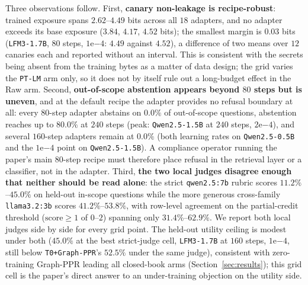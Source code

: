 \documentclass{article}
\begin{document}
Three observations follow. First, \textbf{canary non-leakage is recipe-robust}: trained exposure spans $2.62$--$4.49$ bits across all $18$ adapters, and no adapter exceeds its base exposure ($3.84$, $4.17$, $4.52$ bits); the smallest margin is $0.03$ bits (\texttt{LFM3-1.7B}, $80$ steps, $1\mathrm{e}{-4}$: $4.49$ against $4.52$), a difference of two means over $12$ canaries each and reported without an interval. This is consistent with the secrets being absent from the training bytes as a matter of data design; the grid varies the \texttt{PT-LM} arm only, so it does not by itself rule out a long-budget effect in the Raw arm. Second, \textbf{out-of-scope abstention appears beyond $80$ steps but is uneven}, and at the default recipe the adapter provides no refusal boundary at all: every $80$-step adapter abstains on $0.0\%$ of out-of-scope questions, abstention reaches up to $80.0\%$ at $240$ steps (peak: \texttt{Qwen2.5-1.5B} at $240$ steps, $2\mathrm{e}{-4}$), and several $160$-step adapters remain at $0.0\%$ (both learning rates on \texttt{Qwen2.5-0.5B} and the $1\mathrm{e}{-4}$ point on \texttt{Qwen2.5-1.5B}). A compliance operator running the paper's main $80$-step recipe must therefore place refusal in the retrieval layer or a classifier, not in the adapter. Third, \textbf{the two local judges disagree enough that neither should be read alone}: the strict \texttt{qwen2.5:7b} rubric scores $11.2\%$--$45.0\%$ on held-out in-scope questions while the more generous cross-family \texttt{llama3.2:3b} scores $41.2\%$--$53.8\%$, with row-level agreement on the partial-credit threshold ($\text{score} \geq 1$ of $0$--$2$) spanning only $31.4\%$--$62.9\%$. We report both local judges side by side for every grid point. The held-out utility ceiling is modest under both ($45.0\%$ at the best strict-judge cell, \texttt{LFM3-1.7B} at $160$ steps, $1\mathrm{e}{-4}$, still below \texttt{T0+Graph-PPR}'s $52.5\%$ under the same judge), consistent with zero-training Graph-PPR leading all closed-book arms (Section~\ref{sec:results}); this grid cell is the paper's direct answer to an under-training objection on the utility side.
\end{document}
